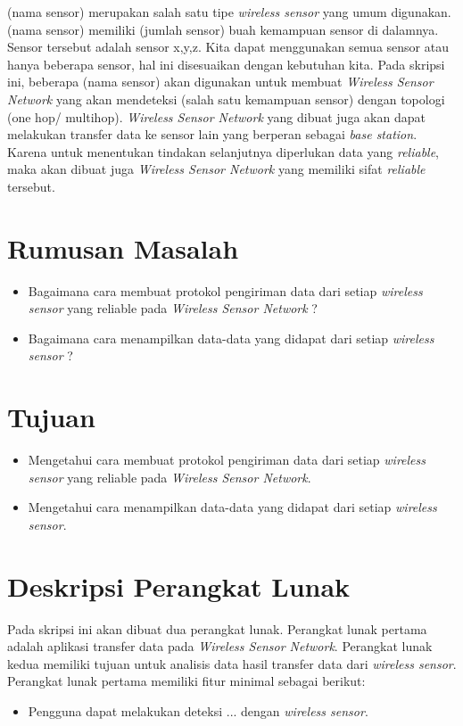 \documentclass[a4paper,twoside]{article}
\begin{document}
(nama sensor) merupakan salah satu tipe {\it wireless sensor} yang umum digunakan. (nama sensor) memiliki (jumlah sensor) buah kemampuan sensor di dalamnya. Sensor tersebut adalah sensor x,y,z. Kita dapat menggunakan semua sensor atau hanya beberapa sensor, hal ini disesuaikan dengan kebutuhan kita. Pada skripsi ini, beberapa (nama sensor) akan digunakan untuk membuat {\it Wireless Sensor Network} yang akan mendeteksi (salah satu kemampuan sensor) dengan topologi (one hop/ multihop). {\it Wireless Sensor Network} yang dibuat juga akan dapat melakukan transfer data ke sensor lain yang berperan sebagai {\it base station}.  Karena untuk menentukan tindakan selanjutnya diperlukan data yang {\it reliable}, maka akan dibuat juga {\it Wireless Sensor Network} yang memiliki sifat {\it reliable} tersebut. 

\section{Rumusan Masalah}
\begin{itemize}
	\item Bagaimana cara membuat protokol pengiriman data dari setiap {\it wireless sensor} yang reliable pada {\it Wireless Sensor Network} ?
	\item Bagaimana cara menampilkan data-data yang didapat dari setiap {\it wireless sensor} ?
\end{itemize}

\section{Tujuan}
\begin{itemize}
	\item Mengetahui cara membuat protokol pengiriman data dari setiap {\it wireless sensor} yang reliable pada {\it Wireless Sensor Network}.
	\item Mengetahui cara menampilkan data-data yang didapat dari setiap {\it wireless sensor}.
\end{itemize}

\section{Deskripsi Perangkat Lunak}
Pada skripsi ini akan dibuat dua perangkat lunak. Perangkat lunak pertama adalah aplikasi transfer data pada {\it Wireless Sensor Network}. Perangkat lunak kedua memiliki tujuan untuk analisis data hasil transfer data dari {\it wireless sensor}. Perangkat lunak pertama memiliki fitur minimal sebagai berikut:
\begin{itemize}
	\item Pengguna dapat melakukan deteksi ... dengan {\it wireless sensor}.		
\end{itemize}
\end{document}
